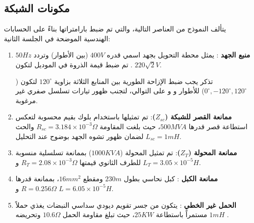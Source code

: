 
\subsection{مكونات الشبكة }
يتألف النموذج من العناصر التالية، والتي تم ضبط بارامتراتها بناءً على الحسابات الهندسية الموضحة في الجلسة الثانية:
\begin{enumerate}
  \item \textbf{منبع الجهد }:
  يمثل محطة التحويل بجهد اسمي قدره $400 V$ (بين الأطوار) وتردد $50 Hz$. تم ضبط قيمة الذروة في الموديل لتكون $220\sqrt{2} V$.\\[-10pt]
  
\begin{arabicbox}{تذكر}
  يجب ضبط الإزاحة الطورية بين المنابع الثلاثة بزاوية $120^\circ$ لتكون ($0^\circ, -120^\circ, 120^\circ$) للأطوار  و  و  على التوالي، لتجنب ظهور تيارات تسلسل صفري غير مرغوبة.
\end{arabicbox}
 

  \item \textbf{ممانعة القصر للشبكة ($Z_{sc}$)}: تم تمثيلها باستخدام بلوك  بقيم محسوبة لتعكس استطاعة قصر قدرها $500 MVA$، حيث بلغت المقاومة $R_{sc} = 3.184 \times 10^{-3} \Omega$ والحث $L_{sc} = 1 mH$ لضمان ظهور تشوه الجهد بوضوح عند التحليل.
  \item \textbf{ممانعة المحولة ($Z_{T}$)}:
  تم تمثيل المحولة ($1000 KVA$) بممانعة تسلسلية منسوبة للطرف الثانوي قيمتها $R_T = 2.08 \times 10^{-3} \Omega$ و $L_T = 3.05 \times 10^{-5} H$.
  \item \textbf{ممانعة الكبل }: كبل نحاسي بطول $230 m$ ومقطع $16 mm^2$، بممانعة قدرها $R = 0.256 \Omega$ و $L = 6.05 \times 10^{-5} H$.
  \item \textbf{الحمل غير الخطي }:
  يتكون من جسر تقويم ديودي سداسي النبضات  يغذي حملاً مستمراً  باستطاعة $25 KW$، حيث تبلغ مقاومة الحمل $10.6 \Omega$ وتحريضه $1 mH$ .
\end{enumerate}
